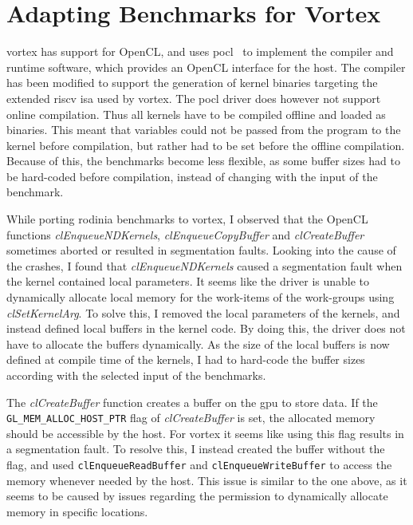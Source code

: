 
\section{Adapting Benchmarks for Vortex}

\Gls{vortex} has support for OpenCL, and uses \gls{pocl}~\cite{pocl} to implement the compiler and runtime software, which provides an OpenCL interface for the host. The compiler has been modified to support the generation of kernel binaries targeting the extended \Gls{riscv} \acrshort{isa} used by \Gls{vortex}. The \gls{pocl} driver does however not support online compilation. Thus all kernels have to be compiled offline and loaded as binaries. This meant that variables could not be passed from the program to the kernel before compilation, but rather had to be set before the offline compilation. Because of this, the benchmarks become less flexible, as some buffer sizes had to be hard-coded before compilation, instead of changing with the input of the benchmark.

While porting \Gls{rodinia} benchmarks to \Gls{vortex}, I observed that the OpenCL functions \textit{clEnqueueNDKernels}, \textit{clEnqueueCopyBuffer} and \textit{clCreateBuffer} sometimes aborted or resulted in segmentation faults. Looking into the cause of the crashes, I found that \textit{clEnqueueNDKernels} caused a segmentation fault when the kernel contained local parameters. It seems like the driver is unable to dynamically allocate local memory for the work-items of the work-groups using \textit{clSetKernelArg}. To solve this, I removed the local parameters of the kernels, and instead defined local buffers in the kernel code. By doing this, the driver does not have to allocate the buffers dynamically. As the size of the local buffers is now defined at compile time of the kernels, I had to hard-code the buffer sizes according with the selected input of the benchmarks.

The \textit{clCreateBuffer} function creates a buffer on the \acrshort{gpu} to store data. If the \texttt{GL\_MEM\_ALLOC\_HOST\_PTR} flag of \textit{clCreateBuffer} is set, the allocated memory should be accessible by the host. For \Gls{vortex} it seems like using this flag results in a segmentation fault. To resolve this, I instead created the buffer without the flag, and used \texttt{clEnqueueReadBuffer} and \texttt{clEnqueueWriteBuffer} to access the memory whenever needed by the host. This issue is similar to the one above, as it seems to be caused by issues regarding the permission to dynamically allocate memory in specific locations.

